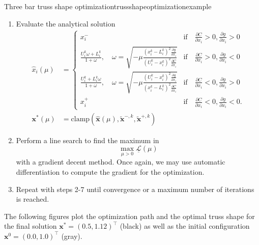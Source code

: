 \begin{example}{Three bar truss shape optimization}{trussshapeoptimizationexample}
\begin{enumerate}
        \item Evaluate the analytical solution
            \begin{align}
                \hat{x}_i(\mu) &= 
                \begin{cases}
                    x^-_i 
                        &\textrm{if} \quad \frac{\partial C}{\partial x_i} > 0, \frac{\partial g}{\partial x_i} > 0 \\
                    \frac{U_i^k\omega + L_i^k}{1+\omega}, \quad \omega = \sqrt{-\mu\frac{(x_i^k-L_i^k)^2\frac{\partial g}{\partial x_i}}{(U_i^k-x_i^k)^2\frac{\partial C}{\partial x_i}}}
                        &\textrm{if} \quad \frac{\partial C}{\partial x_i}  > 0, \frac{\partial g}{\partial x_i} <0\\
                    \frac{U_i^k + L_i^k\omega}{1+\omega}, \quad \omega = \sqrt{-\mu\frac{(U_i^k-x_i^k)^2\frac{\partial g}{\partial x_i}}{(x_i^k-L_i^k)^2\frac{\partial C}{\partial x_i}}} 
                        &\textrm{if} \quad \frac{\partial C}{\partial x_i} < 0, \frac{\partial g}{\partial x_i}  > 0\\
                    x^+_i 
                        &\textrm{if} \quad \frac{\partial C}{\partial x_i}< 0, \frac{\partial g}{\partial x_i} < 0.
                \end{cases} \\
                \mathbf{x}^* (\mu) &= \textrm{clamp}\left(\hat{\mathbf{x}}(\mu), \tilde{\mathbf{x}}^{-,k}, \tilde{\mathbf{x}}^{+,k}\right)
            \end{align}
        \item Perform a line search to find the maximum in 
            \begin{equation}
                \max_{\mu>0} \underline{\mathcal{L}}(\mu)
            \end{equation}
            with a gradient decent method. Once again, we may use automatic differentiation to compute the gradient for the optimization.
        \item Repeat with steps 2-7 until convergence or a maximum number of iterations is reached.
    \end{enumerate}
    
    The following figures plot the optimization path and the optimal truss shape for the final solution $\mathbf{x}^* = (0.5, 1.12)^\top$ (black) as well as the initial configuration $\mathbf{x}^0 = (0.0, 1.0)^\top$ (gray).

    \begin{minipage}{.5\textwidth}
        \centering
        
    \end{minipage}%
    \begin{minipage}{.5\textwidth}
        \centering
        
    \end{minipage}
       
\end{example}


 





